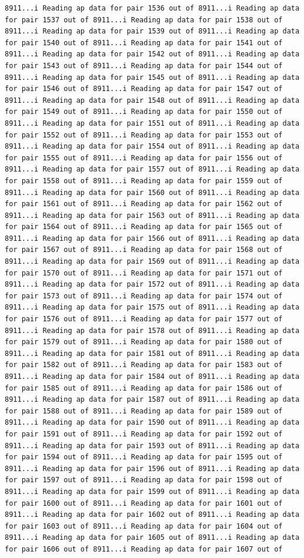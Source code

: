 \documentclass[
]{article}
\begin{document}
\begin{verbatim}
8911...i Reading ap data for pair 1536 out of 8911...i Reading ap data for pair 1537 out of 8911...i Reading ap data for pair 1538 out of 8911...i Reading ap data for pair 1539 out of 8911...i Reading ap data for pair 1540 out of 8911...i Reading ap data for pair 1541 out of 8911...i Reading ap data for pair 1542 out of 8911...i Reading ap data for pair 1543 out of 8911...i Reading ap data for pair 1544 out of 8911...i Reading ap data for pair 1545 out of 8911...i Reading ap data for pair 1546 out of 8911...i Reading ap data for pair 1547 out of 8911...i Reading ap data for pair 1548 out of 8911...i Reading ap data for pair 1549 out of 8911...i Reading ap data for pair 1550 out of 8911...i Reading ap data for pair 1551 out of 8911...i Reading ap data for pair 1552 out of 8911...i Reading ap data for pair 1553 out of 8911...i Reading ap data for pair 1554 out of 8911...i Reading ap data for pair 1555 out of 8911...i Reading ap data for pair 1556 out of 8911...i Reading ap data for pair 1557 out of 8911...i Reading ap data for pair 1558 out of 8911...i Reading ap data for pair 1559 out of 8911...i Reading ap data for pair 1560 out of 8911...i Reading ap data for pair 1561 out of 8911...i Reading ap data for pair 1562 out of 8911...i Reading ap data for pair 1563 out of 8911...i Reading ap data for pair 1564 out of 8911...i Reading ap data for pair 1565 out of 8911...i Reading ap data for pair 1566 out of 8911...i Reading ap data for pair 1567 out of 8911...i Reading ap data for pair 1568 out of 8911...i Reading ap data for pair 1569 out of 8911...i Reading ap data for pair 1570 out of 8911...i Reading ap data for pair 1571 out of 8911...i Reading ap data for pair 1572 out of 8911...i Reading ap data for pair 1573 out of 8911...i Reading ap data for pair 1574 out of 8911...i Reading ap data for pair 1575 out of 8911...i Reading ap data for pair 1576 out of 8911...i Reading ap data for pair 1577 out of 8911...i Reading ap data for pair 1578 out of 8911...i Reading ap data for pair 1579 out of 8911...i Reading ap data for pair 1580 out of 8911...i Reading ap data for pair 1581 out of 8911...i Reading ap data for pair 1582 out of 8911...i Reading ap data for pair 1583 out of 8911...i Reading ap data for pair 1584 out of 8911...i Reading ap data for pair 1585 out of 8911...i Reading ap data for pair 1586 out of 8911...i Reading ap data for pair 1587 out of 8911...i Reading ap data for pair 1588 out of 8911...i Reading ap data for pair 1589 out of 8911...i Reading ap data for pair 1590 out of 8911...i Reading ap data for pair 1591 out of 8911...i Reading ap data for pair 1592 out of 8911...i Reading ap data for pair 1593 out of 8911...i Reading ap data for pair 1594 out of 8911...i Reading ap data for pair 1595 out of 8911...i Reading ap data for pair 1596 out of 8911...i Reading ap data for pair 1597 out of 8911...i Reading ap data for pair 1598 out of 8911...i Reading ap data for pair 1599 out of 8911...i Reading ap data for pair 1600 out of 8911...i Reading ap data for pair 1601 out of 8911...i Reading ap data for pair 1602 out of 8911...i Reading ap data for pair 1603 out of 8911...i Reading ap data for pair 1604 out of 8911...i Reading ap data for pair 1605 out of 8911...i Reading ap data for pair 1606 out of 8911...i Reading ap data for pair 1607 out of 
\end{verbatim}
\end{document}
